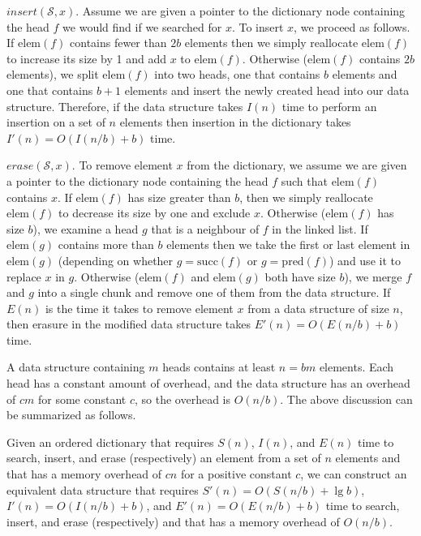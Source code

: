 \documentclass{DIKU-article}
\newcommand{\Insert}{\mbox{$\mathit{insert}$}}
\newcommand{\Erase}{\mbox{$\mathit{erase}$}}
\newcommand{\Pred}{\mathrm{pred}}
\newcommand{\Succ}{\mathrm{succ}}
\newcommand{\Elem}{\mathrm{elem}}
\begin{document}
{\Insert{}$(\mathcal{S}, x)$.
Assume we are given a pointer to the dictionary node containing the
head $f$ we would find if we searched for $x$.  To insert $x$, we
proceed as follows.  If $\Elem(f)$ contains fewer than $2b$ elements
then we simply reallocate $\Elem(f)$ to increase its size by 1 and add
$x$ to $\Elem(f)$.  Otherwise ($\Elem(f)$ contains $2b$ elements), we split
$\Elem(f)$ into two heads, one that contains $b$ elements and one
that contains $b+1$ elements and insert the newly created head
into our data structure.  Therefore, if the data structure takes
$I(n)$ time to perform an insertion on a set of $n$ elements then
insertion in the dictionary takes $I'(n)=O(I(n/b)+b)$ time.

\Erase{}$(\mathcal{S}, x)$.
To remove element $x$ from the dictionary, we assume we are given a
pointer to the dictionary node containing the head $f$ such that
$\Elem(f)$ contains $x$.  If $\Elem(f)$ has size greater than $b$, then
we simply reallocate $\Elem(f)$ to decrease its size by one and exclude
$x$.  Otherwise ($\Elem(f)$ has size $b$), we examine a head $g$
that is a neighbour of $f$ in the linked list.  If $\Elem(g)$ contains
more than $b$ elements then we take the first or last element in
$\Elem(g)$ (depending on whether $g=\Succ(f)$ or $g=\Pred(f)$) and use it
to replace $x$ in $g$.  Otherwise ($\Elem(f)$ and $\Elem(g)$ both have
size $b$), we merge $f$ and $g$ into a single chunk and remove one
of them from the data structure.  If $E(n)$ is the time it takes to
remove element $x$ from a data structure of size $n$, then erasure
in the modified data structure takes $E'(n)=O(E(n/b)+b)$ time.

A data structure containing $m$ heads contains at least $n=bm$
elements.  Each head has a constant amount of overhead, and the data
structure has an overhead of $cm$ for some constant $c$, so the
overhead is $O(n/b)$. The above discussion can be summarized as
follows.

\begin{theorem}
\label{theorem:elementary}
Given an ordered dictionary that requires
$S(n)$, $I(n)$, and $E(n)$ time to search, insert, and erase
(respectively) an element from a set of $n$ elements and that has a memory
overhead of $cn$ for a positive constant $c$, we can construct an equivalent
data structure that requires $S'(n)=O(S(n/b)+\lg b)$,
$I'(n)=O(I(n/b)+b)$, and $E'(n)=O(E(n/b)+b)$ time to
search, insert, and erase (respectively) and that has a memory
overhead of $O(n/b)$.
\end{theorem}
}
\end{document}
